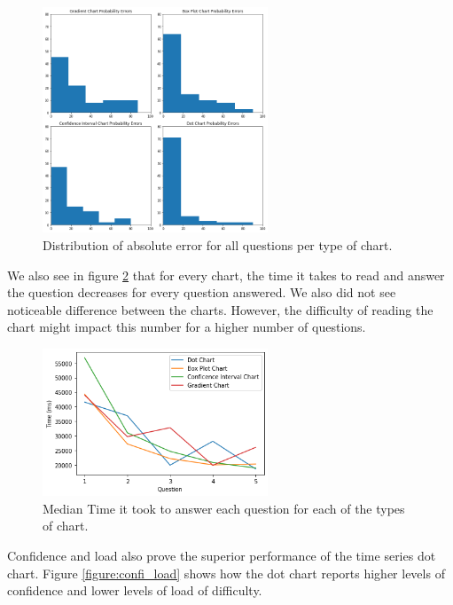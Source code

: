 \documentclass[a4paper,3p,sort&compress]{elsarticle}
\begin{document}
\begin{figure}
  \centering
  \includegraphics[width=0.6\textwidth]{probability_errors}
  \caption{\label{figure:errors}Distribution of absolute error for all questions per type of chart.}
\end{figure}

We also see in figure \ref{figure:duration} that for every chart, the time it takes to read and answer the question decreases for every question answered. We also did not see noticeable difference between the charts. However, the difficulty of reading the chart might impact this number for a higher number of questions.

\begin{figure}
  \centering
   \includegraphics[width=0.6\textwidth]{duration_evo}
  \caption{\label{figure:duration} Median Time it took to answer each question for each of the types of chart.}
\end{figure}  

Confidence and load also prove the superior performance of the time series dot chart. Figure \ref{figure:confi_load} shows how the dot chart reports higher levels of confidence and lower levels of load of difficulty.
\end{document}
